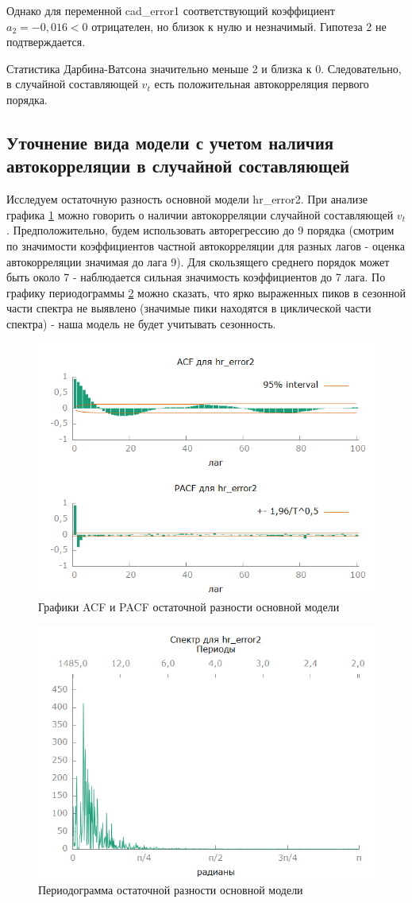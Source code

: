 \documentclass[a4paper,12pt]{article}
\begin{document}
Однако для переменной cad\_error1 соответствующий коэффициент $a_2 = -0,016 < 0$ отрицателен, но близок к нулю и незначимый. Гипотеза 2 не подтверждается.

Статистика Дарбина-Ватсона значительно меньше 2 и близка к 0. Следовательно, в случайной составляющей $v_t$ есть положительная автокорреляция первого порядка.

\subsection{Уточнение вида модели с учетом наличия автокорреляции в случайной составляющей}
Исследуем остаточную разность основной модели hr\_error2. При анализе графика \ref{fig:hr_error2_acf_100} можно говорить о наличии автокорреляции случайной составляющей $v_t$. Предположительно, будем использовать авторегрессию до 9 порядка (смотрим по значимости коэффициентов частной автокорреляции для разных лагов - оценка автокорреляции значимая до лага 9). Для скользящего среднего порядок может быть около 7 - наблюдается сильная значимость коэффициентов до 7 лага. По графику периодограммы \ref{fig:hr_error2_spectr} можно сказать, что ярко выраженных пиков в сезонной части спектра не выявлено (значимые пики находятся в циклической части спектра) - наша модель не будет учитывать сезонность. 

\begin{figure}[H]
	\centering
	\includegraphics[width=0.5\linewidth]{../[graphics]/hr_error2_acf_100.png}
	\caption{Графики ACF и PACF остаточной разности основной модели}
	\label{fig:hr_error2_acf_100}
\end{figure}

\begin{figure}[H]
	\centering
	\includegraphics[width=0.5\linewidth]{../[graphics]/hr_error2_spectr.png}
	\caption{Периодограмма остаточной разности основной модели}
	\label{fig:hr_error2_spectr}
\end{figure}
\end{document}
